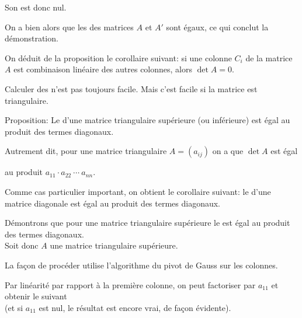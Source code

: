 \change
Son \deter est donc nul. 

\change
On a bien alors que les \deters des matrices $A$ et $A'$ sont égaux, ce qui conclut la démonstration.

\change
On déduit de la proposition le corollaire suivant: 
si une colonne $C_i$ de la matrice $A$ est combinaison linéaire des autres colonnes, alors $\det A=0$.

\diapo

Calculer des \deters n'est pas toujours facile. Mais c'est facile si
la matrice est triangulaire.


Proposition: Le \deter d'une matrice triangulaire supérieure (ou inférieure)
est égal au produit des termes diagonaux.

\change
Autrement dit, pour une matrice triangulaire $A = (a_{ij})$  on a que $\det A$ est égal

\change
au produit $ a_{11}\cdot a_{22} \ \cdots\  a_{nn}.$

\change
Comme cas particulier important, on obtient le corollaire suivant: 
le \deter d'une matrice diagonale est égal au produit des termes diagonaux. 



\diapo

Démontrons que pour une matrice triangulaire supérieure
le \deter est égal au produit des termes diagonaux.
\\
Soit donc $A$ une matrice triangulaire supérieure.

\change
La façon de procéder utilise l'algorithme du pivot de Gauss sur les colonnes.


\change
Par linéarité par rapport à la première colonne, on peut factoriser par $a_{11}$ 
et obtenir le \deter suivant
\\
(et si $a_{11}$ est nul, le résultat est encore vrai, de façon évidente).


